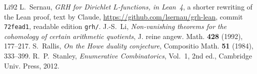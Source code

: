 \documentclass[reqno]{amsart}
\theoremstyle{definition}
\theoremstyle{plain}
\theoremstyle{remark}
\begin{document}
{\small
\begin{thebibliography}{Li92}
 L.~Sernau, \emph{GRH for Dirichlet \(L\)-functions, in Lean~4}, a shorter rewriting of the Lean proof, text by Claude, \url{https://github.com/lsernau/grh-lean}, commit \texttt{72fead1}, readable edition \texttt{grh/}.
 J.-S.~Li, \emph{Non-vanishing theorems for the cohomology of certain arithmetic quotients}, J. reine angew. Math. \textbf{428} (1992), 177--217.
 S.~Rallis, \emph{On the Howe duality conjecture}, Compositio Math. \textbf{51} (1984), 333--399.
 R.~P.~Stanley, \emph{Enumerative Combinatorics}, Vol.~1, 2nd ed., Cambridge Univ. Press, 2012.
\end{thebibliography}
}
\end{document}
